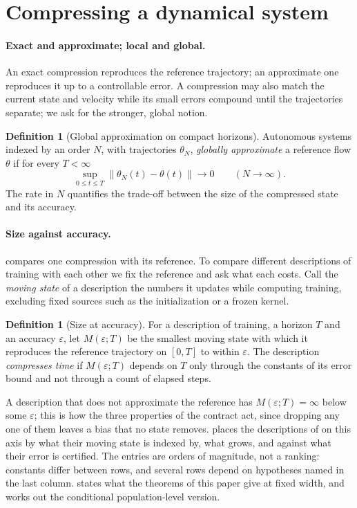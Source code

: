 \documentclass[11pt]{article}
\theoremstyle{definition}
\newtheorem{definition}[theorem]{Definition}
\theoremstyle{remark}
\newcommand{\norm}[1]{\left\lVert #1\right\rVert}
\begin{document}
\section{Compressing a dynamical system}
\label{sec:notions}

\paragraph{Exact and approximate; local and global.}
An exact compression reproduces the reference trajectory; an approximate one
reproduces it up to a controllable error.  A compression may also match the
current state and velocity while its small errors compound until the
trajectories separate; we ask for the stronger, global notion.

\begin{definition}[Global approximation on compact horizons]
\label{def:global}
Autonomous systems indexed by an order $N$, with trajectories $\theta_N$,
\emph{globally approximate} a reference flow $\theta$ if for every $T<\infty$
\[
  \sup_{0\le t\le T}\norm{\theta_N(t)-\theta(t)}\longrightarrow0
  \qquad(N\to\infty).
\]
The rate in $N$ quantifies the trade-off between the size of the compressed
state and its accuracy.
\end{definition}

\paragraph{Size against accuracy.}
 compares one compression with its reference.  To compare
different descriptions of training with each other we fix the reference and ask
what each costs.  Call the \emph{moving state} of a description the numbers it
updates while computing training, excluding fixed sources such as the
initialization or a frozen kernel.

\begin{definition}[Size at accuracy]
\label{def:size}
For a description of training, a horizon $T$ and an accuracy $\varepsilon$, let
$M(\varepsilon;T)$ be the smallest moving state with which it reproduces the
reference trajectory on $[0,T]$ to within $\varepsilon$.  The description
\emph{compresses time} if $M(\varepsilon;T)$ depends on $T$ only through the
constants of its error bound and not through a count of elapsed steps.
\end{definition}

A description that does not approximate the reference has
$M(\varepsilon;T)=\infty$ below some $\varepsilon$; this is how the three
properties of the contract act, since dropping any one of them leaves a bias
that no state removes.   places the descriptions of
 on this axis by what their moving state is indexed by, what
grows, and against what their error is certified.  The entries are orders of
magnitude, not a ranking: constants differ between rows, and several rows
depend on hypotheses named in the last column.   states what the
theorems of this paper give at fixed width, and  works out the
conditional population-level version.
\end{document}
